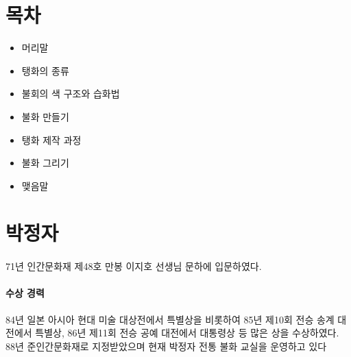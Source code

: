 \documentclass[12pt, a4paper, oneside]{book}
\let\stdsection\section
\renewcommand\section{\newpage\stdsection}
\begin{document}
	\section{ 목차 }

\begin{itemize}[					
		topsep=0.0em,			
		parsep=0.0em,			
		itemsep=0em,			
		leftmargin=	5	em,
		labelwidth=	1	em,			
		labelsep=		1	 em			
]					
	\item	머리말
	\item	탱화의 종류
	\item	불회의 색 구조와 습화법
	\item	불화 만들기
	\item	탱화 제작 과정
	\item	불화 그리기
	\item	맺음말

\end{itemize}					



	\section{ 박정자 }


\paragraph{}
71년 인간문화재 제48호 만봉 이지호 선생님 문하에 입문하였다.

\paragraph{ 수상 경력 }
84년 일본 아시아 현대 미술 대상전에서 특별상을 비롯하여 
85년 제10회 전승 송계 대전에서 특별상,
86년 제11회 전승 공예 대전에서 대통령상 등 많은 상을 수상하였다.
88년 준인간문화재로 지정받았으며 현재 박정자 전통 불화 교실을 운영하고 있다
\end{document}
